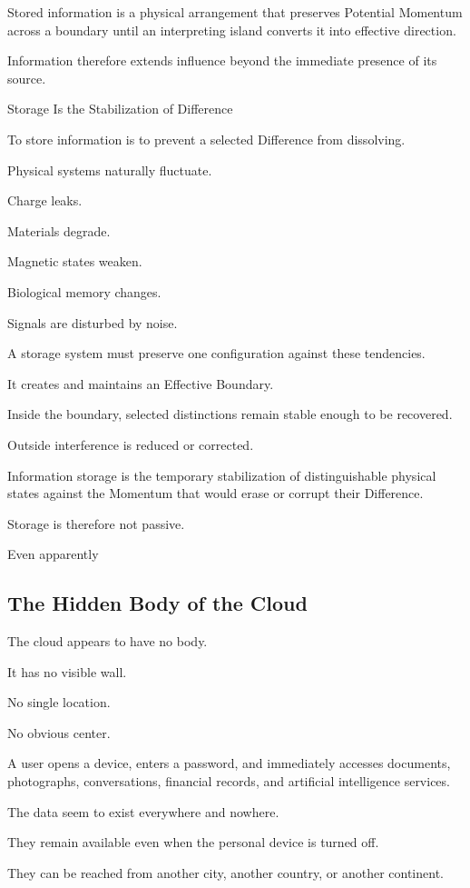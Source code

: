 Stored information is a physical arrangement that preserves Potential Momentum across a boundary until an interpreting island converts it into effective direction.

Information therefore extends influence beyond the immediate presence of its source.

Storage Is the Stabilization of Difference

To store information is to prevent a selected Difference from dissolving.

Physical systems naturally fluctuate.

Charge leaks.

Materials degrade.

Magnetic states weaken.

Biological memory changes.

Signals are disturbed by noise.

A storage system must preserve one configuration against these tendencies.

It creates and maintains an Effective Boundary.

Inside the boundary, selected distinctions remain stable enough to be recovered.

Outside interference is reduced or corrected.

Information storage is the temporary stabilization of distinguishable physical states against the Momentum that would erase or corrupt their Difference.

Storage is therefore not passive.

Even apparently

\subsection*{\textbf{The Hidden Body of the Cloud}}

The cloud appears to have no body.

It has no visible wall.

No single location.

No obvious center.

A user opens a device, enters a password, and immediately accesses documents, photographs, conversations, financial records, and artificial intelligence services.

The data seem to exist everywhere and nowhere.

They remain available even when the personal device is turned off.

They can be reached from another city, another country, or another continent.

